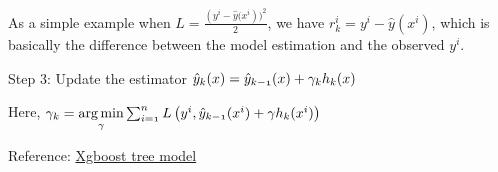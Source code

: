 \documentclass[12pt, oneside]{article}
\begin{document}
As a simple example when $L=\frac{(y^i-\hat{y}{(x^i}))^2}{2}$, we have $r^i_k=y^i-\hat{y}(x^i)$, which is basically the difference between the model estimation and the observed $y^i$.

Step 3: Update the estimator $\mathnormal{\hat{y}_{k}(x)=\hat{y}_{{k-1}}(x)+\gamma _{k}h_{k}(x)}$ 

Here, 
$\mathnormal{\gamma_k = \underset{\gamma}{\operatorname{arg\,min}} \sum_{i=1}^n L\left(y^i, \hat{y}_{k-1}(x^i) + \gamma h_k(x^i)\right)}$

Reference: \href{https://xgboost.readthedocs.io/en/latest/tutorials/model.html#:~:text=XGBoost%20stands%20for%20%E2%80%9CExtreme%20Gradient,Gradient%20Boosting%20Machine%2C%20by%20Friedman.&text=The%20gradient%20boosted%20trees%20has,of%20materials%20on%20the%20topic.}{Xgboost tree model}
\end{document}
